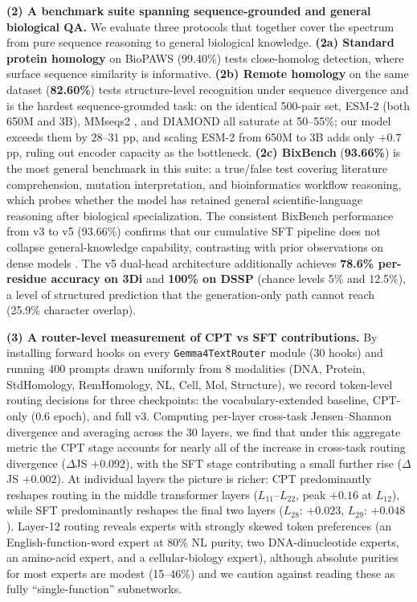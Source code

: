\documentclass[11pt]{article}
\begin{document}
\textbf{(2) A benchmark suite spanning sequence-grounded and general biological QA.} We evaluate three protocols that together cover the spectrum from pure sequence reasoning to general biological knowledge. \textbf{(2a) Standard protein homology} on BioPAWS \citep{wang2026biopaws} (99.40\%) tests close-homolog detection, where surface sequence similarity is informative. \textbf{(2b) Remote homology} on the same dataset (\textbf{82.60\%}) tests structure-level recognition under sequence divergence and is the hardest sequence-grounded task: on the identical 500-pair set, ESM-2 \citep{lin2023evolutionary} (both 650M and 3B), MMseqs2 \citep{steinegger2017mmseqs2}, and DIAMOND \citep{buchfink2021diamond} all saturate at 50--55\%; our model exceeds them by 28--31 pp, and scaling ESM-2 from 650M to 3B adds only $+0.7$ pp, ruling out encoder capacity as the bottleneck. \textbf{(2c) BixBench} \citep{bixbench2024} (\textbf{93.66\%}) is the most general benchmark in this suite: a true/false test covering literature comprehension, mutation interpretation, and bioinformatics workflow reasoning, which probes whether the model has retained general scientific-language reasoning after biological specialization. The consistent BixBench performance from v3 to v5 (93.66\%) confirms that our cumulative SFT pipeline does not collapse general-knowledge capability, contrasting with prior observations on dense models \citep{luo2023forgetting}. The v5 dual-head architecture additionally achieves \textbf{78.6\% per-residue accuracy on 3Di} and \textbf{100\% on DSSP} (chance levels 5\% and 12.5\%), a level of structured prediction that the generation-only path cannot reach (25.9\% character overlap).

\textbf{(3) A router-level measurement of CPT vs SFT contributions.} By installing forward hooks on every \texttt{Gemma4TextRouter} module (30 hooks) and running 400 prompts drawn uniformly from 8 modalities (DNA, Protein, StdHomology, RemHomology, NL, Cell, Mol, Structure), we record token-level routing decisions for three checkpoints: the vocabulary-extended baseline, CPT-only (0.6 epoch), and full v3. Computing per-layer cross-task Jensen--Shannon divergence and averaging across the 30 layers, we find that under this aggregate metric the CPT stage accounts for nearly all of the increase in cross-task routing divergence ($\Delta$JS $+0.092$), with the SFT stage contributing a small further rise ($\Delta$JS $+0.002$). At individual layers the picture is richer: CPT predominantly reshapes routing in the middle transformer layers ($L_{11}$--$L_{22}$, peak $+0.16$ at $L_{12}$), while SFT predominantly reshapes the final two layers ($L_{28}$: $+0.023$, $L_{29}$: $+0.048$). Layer-12 routing reveals experts with strongly skewed token preferences (an English-function-word expert at 80\% NL purity, two DNA-dinucleotide experts, an amino-acid expert, and a cellular-biology expert), although absolute purities for most experts are modest (15--46\%) and we caution against reading these as fully ``single-function'' subnetworks.
\end{document}
